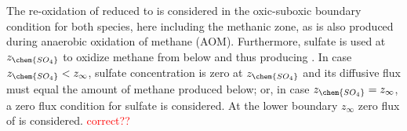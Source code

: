 \documentclass[gmd, manuscript]{copernicus}
\begin{document}
The re-oxidation of reduced  to  is considered in the 
oxic-suboxic boundary condition for both species, here including the methanic zone, as  is also produced during anaerobic oxidation of methane (AOM). 
Furthermore, sulfate is used at $z_{\chem{SO_4}}$ to oxidize methane from below and thus producing . 
In case $z_{\chem{SO_4}}<z_\infty$, sulfate concentration is zero at $z_{\chem{SO_4}}$ and its diffusive flux must equal the amount of methane produced below; or, in case $z_{\chem{SO_4}}=z_\infty$, 
a zero flux condition for sulfate is considered. At the lower boundary $z_\infty$ zero flux of  is considered. 
\textcolor{red}{correct??}\\
\end{document}
